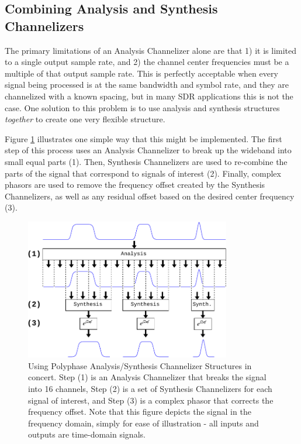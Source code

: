 \documentclass[12pt]{report}
\begin{document}
\subsection{Combining Analysis and Synthesis Channelizers}
\label{sec:combine_analysis_synthesis}
The primary limitations of an Analysis Channelizer alone are that 1) it is limited
to a single output sample rate, and 2) the channel center frequencies must be
a multiple of that output sample rate. This is perfectly acceptable when every
signal being processed is at the same bandwidth and symbol rate, and they are
channelized with a known spacing, but in many SDR applications this is not the
case. One solution to this problem is to use analysis and synthesis structures
\emph{together} to create one very flexible structure.

Figure \ref{fig:analysis_and_synthesis} illustrates one simple way that this
might be implemented. The first step of this process uses an Analysis
Channelizer to break up the wideband into small equal parts (1). Then,
Synthesis Channelizers are used to re-combine the parts of the signal that
correspond to signals of interest (2). Finally, complex phasors are used to
remove the frequency offset created by the Synthesis Channelizers, as well as
any residual offset based on the desired center frequency (3).

\begin{figure}[h!]
    \begin{center}
    \includegraphics[width=0.8\textwidth]{polyphase}%
    \end{center}
    \caption{
Using Polyphase Analysis/Synthesis Channelizer Structures in concert. Step (1)
is an Analysis Channelizer that breaks the signal into 16 channels, Step (2) is
a set of Synthesis Channelizers for each signal of interest, and Step (3) is
a complex phasor that corrects the frequency offset. Note that this figure
depicts the signal in the frequency domain, simply for ease of illustration -
all inputs and outputs are time-domain signals.
    }
    \label{fig:analysis_and_synthesis}
\end{figure}
\end{document}
